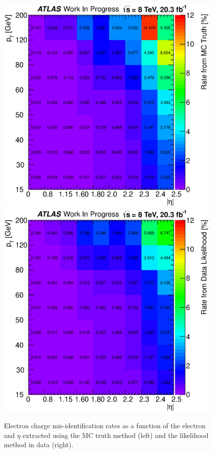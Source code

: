 \begin{figure}[htp]
\centering
\includegraphics[width=0.45\columnwidth]{figures/ChargeMisID/Nov5_2015_TruthRates_Plot.eps}
\includegraphics[width=0.45\columnwidth]{figures/ChargeMisID/Nov5_2015_DataRates_Plot.eps}
\caption{Electron charge mis-identification rates as a function of
the electron \pt and $\eta$ extracted using the MC
truth method (left) and the likelihood method in data (right). }
\label{fig:chargemisid_rates_contour}
\end{figure}

